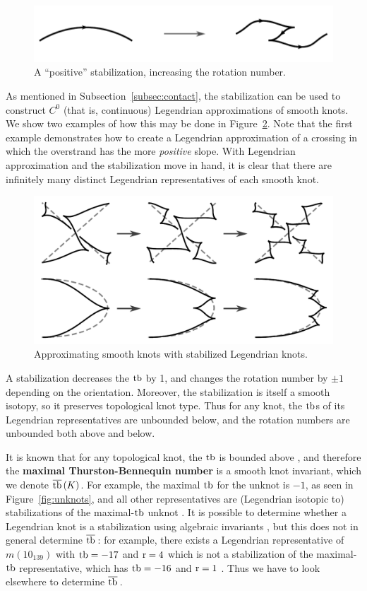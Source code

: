 \begin{figure}[ht]
    \centering
    \includegraphics[width=0.6\linewidth]{images/stabilization.pdf}
    \caption{A ``positive'' stabilization, increasing the rotation number.}%
    \label{fig:stabilization}
\end{figure}

As mentioned in Subsection~\ref{subsec:contact}, the stabilization can be used to construct $C^0$ (that is, continuous) Legendrian approximations of smooth knots. We show two examples of how this may be done in Figure~\ref{fig:approximation}.
Note that the first example demonstrates how to create a Legendrian approximation of a crossing in which the overstrand has the more \emph{positive} slope.
With Legendrian approximation and the stabilization move in hand, it is clear that there are infinitely many distinct Legendrian representatives of each smooth knot.

\begin{figure}[ht]
    \centering
    \includegraphics[width=0.7\linewidth]{images/approximation.pdf}
    \caption{Approximating smooth knots with stabilized Legendrian knots.}
    \label{fig:approximation}
\end{figure}

A stabilization decreases the $\operatorname{tb}$ by 1, and changes the rotation number by $\pm 1$ depending on the orientation. Moreover, the stabilization is itself a smooth isotopy, so it preserves topological knot type. Thus for any knot, the $\operatorname{tb}$s of its Legendrian representatives are unbounded below, and the rotation numbers are unbounded both above and below.

It is known that for any topological knot, the $\operatorname{tb}$ is bounded above \cite{bennequin}, and therefore the \textbf{maximal Thurston-Bennequin number} is a smooth knot invariant, which we denote $\overline{\operatorname{tb}}\,(K)$.
For example, the maximal $\operatorname{tb}$ for the unknot is $-1$, as seen in Figure~\ref{fig:unknots}, and all other representatives are (Legendrian isotopic to) stabilizations of the maximal-$\operatorname{tb}$ unknot \cite{atlas}.
It is possible to determine whether a Legendrian knot is a stabilization using algebraic invariants \cite{chekanov}, but this does not in general determine $\overline{\operatorname{tb}}\,$: for example, there exists a Legendrian representative of $m(10_{139})$ with $\operatorname{tb} = -17$ and $\operatorname{r} = 4$ which is not a stabilization of the maximal-$\operatorname{tb}$ representative, which has $\operatorname{tb} = -16$ and $\operatorname{r} = 1$ \cite{atlas}. Thus we have to look elsewhere to determine $\overline{\operatorname{tb}}\,$.

